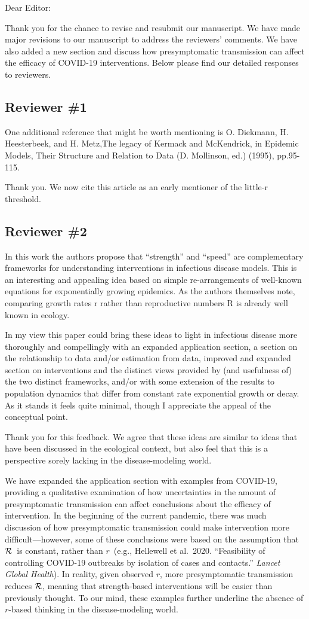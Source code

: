 \documentclass[12pt]{article}
\newcommand{\rr}{\ensuremath{{r}}}
\newcommand{\RR}{\ensuremath{{\cal R}}}
\newcommand{\rev}{\subsection*}
\newcommand{\revtext}{\textsf}
\begin{document}
\noindent Dear Editor:

Thank you for the chance to revise and resubmit our manuscript. 
We have made major revisions to our manuscript to address the reviewers' comments.
We have also added a new section and discuss how presymptomatic transmission can affect the efficacy of COVID-19 interventions.
Below please find our detailed responses to reviewers.

\rev{Reviewer \#1}

\revtext{One additional reference that might be worth mentioning is O. Diekmann,
H. Heesterbeek, and H. Metz,The legacy of Kermack and McKendrick, in
Epidemic Models, Their Structure and Relation to Data (D. Mollinson,
ed.) (1995), pp.95-115.}

Thank you. We now cite this article as an early mentioner of the
little-r threshold.

\rev{Reviewer \#2}

\revtext{In this work the authors propose that ``strength'' and ``speed'' are
complementary frameworks for understanding interventions in infectious
disease models. This is an interesting and appealing idea based on
simple re-arrangements of well-known equations for exponentially growing
epidemics. As the authors themselves note, comparing growth rates r
rather than reproductive numbers R is already well known in ecology.}

\revtext{In my view this paper could bring these ideas to light in infectious
disease more thoroughly and compellingly with an expanded application
section, a section on the relationship to data and/or estimation from
data, improved and expanded section on interventions and the distinct
views provided by (and usefulness of) the two distinct frameworks,
and/or with some extension of the results to population dynamics that
differ from constant rate exponential growth or decay. As it stands it
feels quite minimal, though I appreciate the appeal of the conceptual
point.}

Thank you for this feedback. We agree that these ideas are similar to
ideas that have been discussed in the ecological context, but also feel
that this is a perspective sorely lacking in the disease-modeling world.

We have expanded the
application section with examples from COVID-19, providing a qualitative
examination of how uncertainties in the amount of presymptomatic
transmission can affect conclusions about the efficacy of intervention.
In the beginning of the current pandemic, there was much discussion of
how presymptomatic transmission could make intervention more
difficult---however, some of these conclusions were based on the
assumption that \RR\ is constant, rather than \rr\ (e.g., Hellewell et
al.~2020. ``Feasibility of controlling COVID-19 outbreaks by isolation
of cases and contacts.'' \emph{ Lancet Global Health}). In reality, given
observed \rr, more presymptomatic transmission reduces \RR, meaning that
strength-based interventions will be easier than previously thought. To
our mind, these examples further underline the absence of \rr-based
thinking in the disease-modeling world. 
\end{document}
